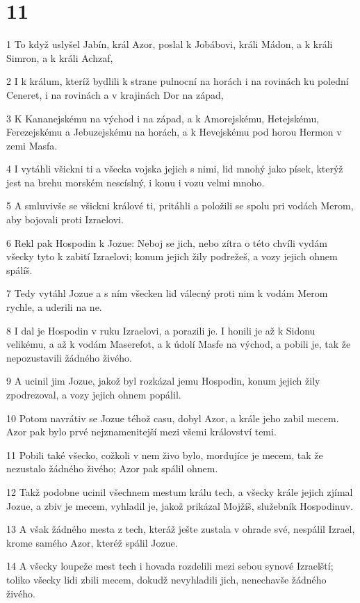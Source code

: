 \chapter{11}

\par 1 To když uslyšel Jabín, král Azor, poslal k Jobábovi, králi Mádon, a k králi Simron, a k králi Achzaf,
\par 2 I k králum, kteríž bydlili k strane pulnocní na horách i na rovinách ku polední Ceneret, i na rovinách a v krajinách Dor na západ,
\par 3 K Kananejskému na východ i na západ, a k Amorejskému, Hetejskému, Ferezejskému a Jebuzejskému na horách, a k Hevejskému pod horou Hermon v zemi Masfa.
\par 4 I vytáhli všickni ti a všecka vojska jejich s nimi, lid mnohý jako písek, kterýž jest na brehu morském nescíslný, i konu i vozu velmi mnoho.
\par 5 A smluvivše se všickni králové ti, pritáhli a položili se spolu pri vodách Merom, aby bojovali proti Izraelovi.
\par 6 Rekl pak Hospodin k Jozue: Neboj se jich, nebo zítra o této chvíli vydám všecky tyto k zabití Izraelovi; konum jejich žily podrežeš, a vozy jejich ohnem spálíš.
\par 7 Tedy vytáhl Jozue a s ním všecken lid válecný proti nim k vodám Merom rychle, a uderili na ne.
\par 8 I dal je Hospodin v ruku Izraelovi, a porazili je. I honili je až k Sidonu velikému, a až k vodám Maserefot, a k údolí Masfe na východ, a pobili je, tak že nepozustavili žádného živého.
\par 9 A ucinil jim Jozue, jakož byl rozkázal jemu Hospodin, konum jejich žily zpodrezoval, a vozy jejich ohnem popálil.
\par 10 Potom navrátiv se Jozue téhož casu, dobyl Azor, a krále jeho zabil mecem. Azor pak bylo prvé nejznamenitejší mezi všemi království temi.
\par 11 Pobili také všecko, cožkoli v nem živo bylo, mordujíce je mecem, tak že nezustalo žádného živého; Azor pak spálil ohnem.
\par 12 Takž podobne ucinil všechnem mestum králu tech, a všecky krále jejich zjímal Jozue, a zbiv je mecem, vyhladil je, jakož prikázal Mojžíš, služebník Hospodinuv.
\par 13 A však žádného mesta z tech, kteráž ješte zustala v ohrade své, nespálil Izrael, krome samého Azor, kteréž spálil Jozue.
\par 14 A všecky loupeže mest tech i hovada rozdelili mezi sebou synové Izraelští; toliko všecky lidi zbili mecem, dokudž nevyhladili jich, nenechavše žádného živého.
